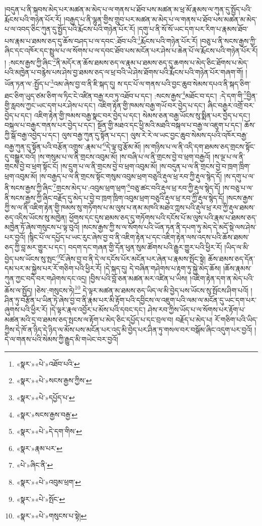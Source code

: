 །བདུན་པ་ནི་སྐབས་མེད་པར་མཚན་མ་མེད་པ་ལ་གནས་པ་ཐོབ་པས་མཚན་མ་ཕྲ་མོ་རྣམས་ལ་ཀུན་དུ་སྤྱོད་པའི་རྨོངས་པའི་གཉེན་པོར་རོ། །བརྒྱད་པ་ནི་ལྷུན་གྱིས་གྲུབ་པར་མཚན་མ་མེད་པ་ལ་གནས་པ་ཐོབ་པས་མཚན་མ་མེད་པ་ལ་འབད་ཅིང་ཀུན་དུ་སྤྱོད་པའི་རྨོངས་པའི་གཉེན་པོར་རོ། །དགུ་པ་ནི་སོ་སོ་ཡང་དག་པར་རིག་པ་རྣམས་ཐོབ་པས་རྣམ་པ་ཐམས་ཅད་དུ་ཆོས་བཤད་པ་ལ་དབང་:ཐོབ་པའི་\footnote{«སྣར་»«པེ་»འཐོབ་པའི་}རྨོངས་པའི་གཉེན་པོར་རོ། །བཅུ་པ་ནི་སངས་རྒྱས་ཀྱི་ཞིང་དང་འཁོར་དང་སྤྲུལ་པ་ལ་སོགས་པ་ལ་དབང་ཐོབ་པས་མངོན་པར་ཤེས་པ་ཆེན་པོ་ལ་རྨོངས་པའི་གཉེན་པོར་རོ། །
:སངས་རྒྱས་ཀྱི་ཞིང་\footnote{«སྣར་»«པེ་»སངས་རྒྱས་ཀྱིས་}ནི་མདོར་ན་ཆོས་ཐམས་ཅད་ལ་རྣམ་པ་ཐམས་ཅད་དུ་ཆགས་པ་མེད་ཅིང་ཐོགས་པ་མེད་པའི་མཁྱེན་པ་བརྙེས་པས་ཤེས་བྱ་ཐམས་ཅད་ལ་ཕྲ་བའི་ཡེ་ཤེས་ཐོགས་པའི་རྨོངས་པའི་གཉེན་པོར་གཞག་གོ། །ཡོན་ཏན་ལ་:སྤྱོད་པ་\footnote{«སྣར་»«པེ་»དཔྱོད་པ་}འམ་ཞེས་བྱ་བ་ནི་ཇི་སྐད་དུ། ས་དང་པོ་ལ་གནས་པའི་བྱང་ཆུབ་སེམས་དཔའ་ནི་སྐད་ཅིག་ཐང་ཅིག་ཡུད་ཙམ་ཅིག་ལ་ཏིང་ངེ་འཛིན་བརྒྱ་རབ་ཏུ་འཐོབ་པ་དང་། :སངས་རྒྱས་\footnote{«སྣར་»སངས་རྒྱས་བརྒྱ་}མཐོང་བ་དང་། :དེ་དག་གི་\footnote{«སྣར་»«པེ་»དེ་དག་གིས་}བྱིན་གྱི་རླབས་ཀྱང་ཡང་དག་པར་ཤེས་པ་དང་། འཇིག་རྟེན་གྱི་ཁམས་བརྒྱ་གཡོ་བར་བྱེད་པ་དང་། ཞིང་བརྒྱར་འགྲོ་བར་བྱེད་པ་དང་། འཇིག་རྟེན་གྱི་ཁམས་བརྒྱ་སྣང་བར་བྱེད་པ་དང་། སེམས་ཅན་བརྒྱ་ཡོངས་སུ་སྨིན་པར་བྱེད་པ་དང་། བསྐལ་པ་བརྒྱར་གནས་པར་བྱེད་པ་དང་། སྔོན་གྱི་མཐའ་དང་ཕྱི་མའི་མཐའི་བསྐལ་པ་བརྒྱ་ལ་འཇུག་པ་དང་། ཆོས་ཀྱི་སྒོ་བརྒྱ་འབྱེད་པ་དང་། ལུས་བརྒྱ་ཀུན་དུ་སྟོན་པ་དང་། ལུས་རེ་རེ་ལ་ཡང་བྱང་ཆུབ་སེམས་དཔའི་འཁོར་བརྒྱ་བརྒྱ་ཀུན་དུ་སྟོན་པའི་བརྩོན་འགྲུས་:རྣམ་པ་\footnote{«སྣར་»རྣམ་པར་}དེ་ལྟ་བུ་རྩོམ་མོ། །ས་གཉིས་པ་ལ་ནི་འདི་དག་ཐམས་ཅད་གྲངས་སྟོང་དུ་བསྒྱུར་བའོ། །ས་གསུམ་པ་ལ་ནི་གྲངས་འབུམ་མོ། །ས་བཞི་པ་ལ་ནི་གྲངས་བྱེ་བ་ཕྲག་བརྒྱའོ། །ས་ལྔ་པ་ལ་ནི་གྲངས་བྱེ་བ་ཕྲག་སྟོང་ངོ། །ས་དྲུག་པ་ལ་ནི་གྲངས་བྱེ་བ་ཕྲག་འབུམ་མོ། །ས་བདུན་པ་ལ་ནི་གྲངས་བྱེ་བ་ཁྲག་ཁྲིག་ཕྲག་འབུམ་མོ། །ས་བརྒྱད་པ་ལ་ནི་གྲངས་སྟོང་གསུམ་འབུམ་ཕྲག་བཅུའི་རྡུལ་ཕྲ་རབ་ཀྱི་རྡུལ་སྙེད་དོ། །ས་དགུ་པ་ལ་ནི་སངས་རྒྱས་ཀྱི་ཞིང་\footnote{«པེ་»ཞིང་ནི་}གྲངས་མེད་པ་:འབུམ་ཕྲག་ཕྲག་\footnote{«སྣར་»«པེ་»འབུམ་ཕྲག་}བཅུ་ཚང་བའི་རྡུལ་ཕྲ་རབ་ཀྱི་རྡུལ་སྙེད་དོ། །ས་བཅུ་པ་ལ་ནི་སངས་རྒྱས་ཀྱི་ཞིང་བརྗོད་དུ་མེད་པ་བྱེ་བ་ཁྲག་ཁྲིག་འབུམ་ཕྲག་བཅུའི་རྡུལ་ཕྲ་རབ་ཀྱི་རྡུལ་སྙེད་དོ། །སངས་རྒྱས་ཀྱི་ས་ལ་ནི་འཇིག་རྟེན་གྱི་ཁམས་སུ་གཏོགས་པ་མ་ལུས་པ་ནམ་མཁའི་མཐའ་ཀླས་པའི་རྡུལ་ཕྲ་རབ་ཀྱི་རྡུལ་ཐམས་ཅད་འདིས་ཡོངས་སུ་མཁྱེན། ཕྱོགས་དང་དུས་ཐམས་ཅད་དུ་གཏོགས་པའི་དངོས་པོ་མ་ལུས་པའི་རྣམ་པ་ཐམས་ཅད་མཁྱེན་ཏོ་ཞེས་གསུངས་པ་ལྟ་བུའོ། །སངས་རྒྱས་ཀྱི་ས་ལ་སོགས་པའི་ཡོན་ཏན་ནི་དཔག་ཏུ་མེད་དེ་མདོ་སྡེ་ལས་ཤེས་པར་བྱའོ། །སྙིང་པོ་ལ་དཔྱོད་པ་ཡང་རུང་ཞེས་བྱ་བ་ནི་འཇིག་རྟེན་པ་དང་འཇིག་རྟེན་ལས་འདས་པའི་ཆོས་ཐམས་ཅད་ཀྱི་བླ་མར་གྱུར་པ་དང་། བདག་དང་གཞན་གྱི་དོན་ཕུན་སུམ་ཚོགས་པའི་རྒྱུར་གྱུར་པའི་ཕྱིར་རོ། །ཡིད་ལ་མི་བྱེད་པས་ཡོངས་སུ་སྤང་\footnote{«སྣར་»«པེ་»སྤོང་}ངོ་ཞེས་བྱ་བ་ནི་དེ་ལ་དངོས་པོར་མངོན་པར་ཞེན་པ་རྣམས་སྤོང་སྟེ། ཆོས་ཐམས་ཅད་དོན་དམ་པར་མ་སྐྱེས་པར་རོ་གཅིག་པའི་ཕྱིར་རོ། །དེ་སྐད་དུ། དེ་བཞིན་གཤེགས་པ་རྟག་ཏུ་སྐྱེ་མེད་ཆོས། །ཆོས་རྣམས་ཀུན་ཀྱང་བདེ་བར་གཤེགས་དང་འདྲ། །བྱིས་པའི་བློ་ཅན་མཚན་མར་འཛིན་པ་ཡིས། །འཇིག་རྟེན་དག་ན་མེད་པའི་ཆོས་ལ་སྤྱོད། །ཅེས་:གསུངས་ཏེ།\footnote{«སྣར་»«པེ་»གསུངས་པ་སྟེ།} དེ་ལྟར་མཚན་མ་ཐམས་ཅད་ཡིད་ལ་མི་བྱེད་པས་ཡོངས་སུ་སྤོངས་ཤིག་པའོ། །ཤིན་ཏུ་བརྩོན་པ་ཡིན་ཏེ་ཞེས་བྱ་བ་ནི་རྣམ་པར་མི་རྟོག་པའི་དབྱིངས་ལ་འཇུག་པའི་ལམ་ལ་མངོན་དུ་ཡང་དག་པར་ཞུགས་པའི་ཕྱིར་རོ། །དེ་ལྟར་རྣལ་འབྱོར་པ་མོས་པའི་དབང་དང་། ཤེས་རབ་ཀྱིས་ཡོད་པ་ལ་སོགས་པར་རྟོག་པ་མཚན་མའི་དྲ་བ་ཐམས་ཅད་སྤངས་ལ་རྟོག་པ་མེད་ཅིང་དཔྱོད་པ་དང་བྲལ་བ། བརྗོད་པ་མེད་པ། རོ་གཅིག་པའི་ཡིད་ཀྱིས་དེ་ཁོ་ན་ཉིད་དེ་ཉིད་ལ་མོས་པས་མངོན་པར་འདུ་མི་བྱེད་པར་ཤིན་ཏུ་གསལ་བར་བསྒོམ་ཞིང་འདུག་པར་བྱའོ། །དེ་ལ་གནས་པའི་སེམས་ཀྱི་རྒྱུད་མི་གཡེང་བར་བྱའོ། 